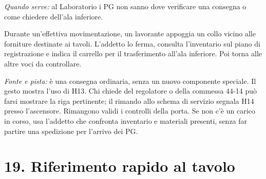 \documentclass[11pt,a4paper]{article}
\begin{document}
\begin{enumerate}[leftmargin=*]
\textit{Quando serve:} al Laboratorio i PG non sanno dove verificare una consegna o come chiedere dell'ala inferiore.

Durante un'effettiva movimentazione, un lavorante appoggia un collo vicino alle forniture destinate ai tavoli. L'addetto lo ferma, consulta l'inventario sul piano di registrazione e indica il carrello per il trasferimento all'ala inferiore. Poi torna alle altre voci da controllare.

\textit{Fonte e pista:} è una consegna ordinaria, senza un nuovo componente speciale. Il gesto mostra l'uso di H13. Chi chiede del regolatore o della commessa 44-14 può farsi mostrare la riga pertinente; il rimando allo schema di servizio segnala H14 presso l'ascensore. Rimangono validi i controlli della porta. Se non c'è un carico in corso, usa l'addetto che confronta inventario e materiali presenti, senza far partire una spedizione per l'arrivo dei PG.
\end{enumerate}

\section{19. Riferimento rapido al tavolo}
\end{document}
